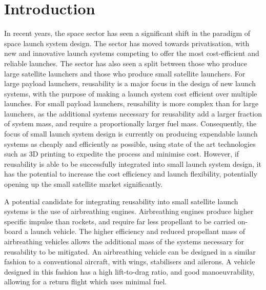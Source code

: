 
\cleardoublepage
\chapter{Introduction}

  	
  	
  	In recent years, the space sector has seen a significant shift in the paradigm of space launch system design. 
  	The sector has moved towards privatisation, with new and innovative launch systems competing to offer the most cost-efficient and reliable launches. 
  	The sector has also seen a split between those who produce large satellite launchers and those who produce small satellite launchers.
  	For large payload launchers, reusability is a major focus in the design of new launch systems, with the purpose of making a launch system cost efficient over multiple launches. 
  	For small payload launchers, reusability is more complex than for large launchers, as the additional systems necessary for reusability add a larger fraction of system mass, and require a proportionally larger fuel mass. 
  	Consequently, the focus of small launch system design is currently on producing expendable launch systems as cheaply and efficiently as possible, using state of the art technologies such as 3D printing to expedite the process and minimise cost\cite{Niederstrasser2015}.
  	However, if reusability is able to be successfully integrated into small launch system design, it has the potential to increase the cost efficiency and launch flexibility, potentially opening up the small satellite market significantly. 
  	
  	
  	
  	A potential candidate for integrating reusability into small satellite launch systems is the use of airbreathing engines\cite{Smart2009a,Ketsdever2010}.
Airbreathing engines produce higher specific impulse than rockets, and require far less propellant to be carried on-board a launch vehicle\cite{Smart2010}.  	 
  	The higher efficiency and reduced propellant mass of airbreathing vehicles allows the additional mass of the systems necessary for reusability to be mitigated\cite{Curran2003}. An airbreathing vehicle can be designed in a similar fashion to a conventional aircraft, with wings, stabilisers and ailerons\cite{Shaughnessy1990}. A vehicle designed in this fashion has a high lift-to-drag ratio, and good manoeuvrability, allowing for a return flight which uses minimal fuel.
  	
